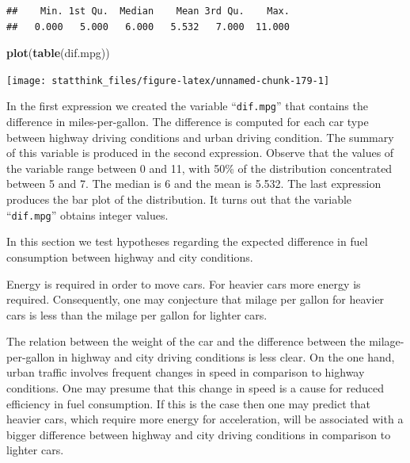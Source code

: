 \documentclass[
]{krantz}
\makeatletter
\newenvironment{Shaded}{\begin{snugshade}}{\end{snugshade}}
\newcommand{\KeywordTok}[1]{\textcolor[rgb]{0.13,0.29,0.53}{\textbf{#1}}}
\newcommand{\NormalTok}[1]{#1}
\newcommand{\OperatorTok}[1]{\textcolor[rgb]{0.81,0.36,0.00}{\textbf{#1}}}
\newcommand{\StringTok}[1]{\textcolor[rgb]{0.31,0.60,0.02}{#1}}
\newenvironment{kframe}{%
\medskip{}
\setlength{\fboxsep}{.8em}
 \def\at@end@of@kframe{}%
 \ifinner\ifhmode%
  \def\at@end@of@kframe{\end{minipage}}%
  \begin{minipage}{\columnwidth}%
 \fi\fi%
 \def\FrameCommand##1{\hskip\@totalleftmargin \hskip-\fboxsep
 \colorbox{shadecolor}{##1}\hskip-\fboxsep
     \hskip-\linewidth \hskip-\@totalleftmargin \hskip\columnwidth}%
 \MakeFramed {\advance\hsize-\width
   \@totalleftmargin\z@ \linewidth\hsize
   \@setminipage}}%
 {\par\unskip\endMakeFramed%
 \at@end@of@kframe}
\renewenvironment{Shaded}{\begin{kframe}}{\end{kframe}}
\theoremstyle{definition}
\theoremstyle{definition}
\theoremstyle{definition}
\theoremstyle{remark}
\makeatother
\begin{document}
\begin{Shaded}
\end{Shaded}

\begin{verbatim}
##    Min. 1st Qu.  Median    Mean 3rd Qu.    Max. 
##   0.000   5.000   6.000   5.532   7.000  11.000
\end{verbatim}

\begin{Shaded}
\begin{Highlighting}[]
\KeywordTok{plot}\NormalTok{(}\KeywordTok{table}\NormalTok{(dif.mpg))}
\end{Highlighting}
\end{Shaded}

\begin{center}\texttt{[image: statthink\_files/figure-latex/unnamed-chunk-179-1]} \end{center}

In the first expression we created the variable ``\texttt{dif.mpg}'' that
contains the difference in miles-per-gallon. The difference is computed
for each car type between highway driving conditions and urban driving
condition. The summary of this variable is produced in the second
expression. Observe that the values of the variable range between 0 and
11, with 50\% of the distribution concentrated between 5 and 7. The
median is 6 and the mean is 5.532. The last expression produces the bar
plot of the distribution. It turns out that the variable ``\texttt{dif.mpg}''
obtains integer values.

In this section we test hypotheses regarding the expected difference in
fuel consumption between highway and city conditions.

Energy is required in order to move cars. For heavier cars more energy
is required. Consequently, one may conjecture that milage per gallon for
heavier cars is less than the milage per gallon for lighter cars.

The relation between the weight of the car and the difference between
the milage-per-gallon in highway and city driving conditions is less
clear. On the one hand, urban traffic involves frequent changes in speed
in comparison to highway conditions. One may presume that this change in
speed is a cause for reduced efficiency in fuel consumption. If this is
the case then one may predict that heavier cars, which require more
energy for acceleration, will be associated with a bigger difference
between highway and city driving conditions in comparison to lighter
cars.
\end{document}
